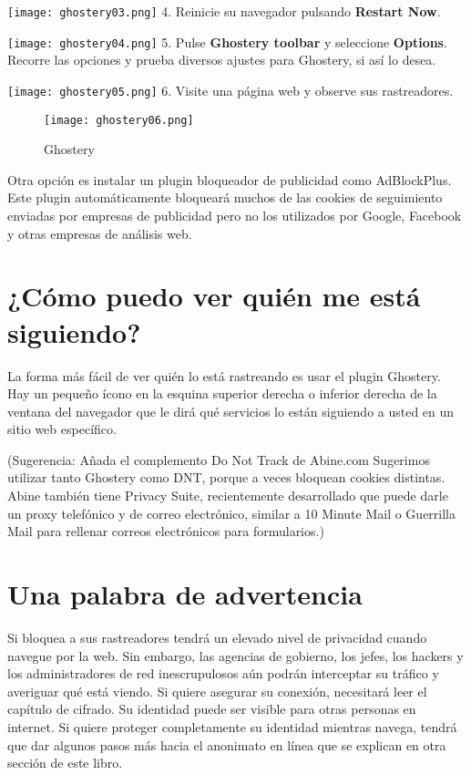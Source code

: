 \documentclass[10pt,a5paper,twoside,,]{book}
\begin{document}
\texttt{[image: ghostery03.png]} 4. Reinicie su navegador pulsando
\textbf{Restart Now}.

\texttt{[image: ghostery04.png]} 5. Pulse \textbf{Ghostery toolbar} y
seleccione \textbf{Options}. Recorre las opciones y prueba diversos
ajustes para Ghostery, si así lo desea.

\texttt{[image: ghostery05.png]} 6. Visite una página web y observe sus
rastreadores.

\begin{figure}[htbp]
\centering
\texttt{[image: ghostery06.png]}
\caption{Ghostery}
\end{figure}

Otra opción es instalar un plugin bloqueador de publicidad como
AdBlockPlus. Este plugin automáticamente bloqueará muchos de las cookies
de seguimiento enviadas por empresas de publicidad pero no los
utilizados por Google, Facebook y otras empresas de análisis web.

\section{¿Cómo puedo ver quién me está
siguiendo?}\label{cuxf3mo-puedo-ver-quiuxe9n-me-estuxe1-siguiendo}

La forma más fácil de ver quién lo está rastreando es usar el plugin
Ghostery. Hay un pequeño ícono en la esquina superior derecha o inferior
derecha de la ventana del navegador que le dirá qué servicios lo están
siguiendo a usted en un sitio web específico.

(Sugerencia: Añada el complemento Do Not Track de Abine.com Sugerimos
utilizar tanto Ghostery como DNT, porque a veces bloquean cookies
distintas. Abine también tiene Privacy Suite, recientemente desarrollado
que puede darle un proxy telefónico y de correo electrónico, similar a
10 Minute Mail o Guerrilla Mail para rellenar correos electrónicos para
formularios.)

\section{Una palabra de advertencia}\label{una-palabra-de-advertencia}

Si bloquea a sus rastreadores tendrá un elevado nivel de privacidad
cuando navegue por la web. Sin embargo, las agencias de gobierno, los
jefes, los hackers y los administradores de red inescrupulosos aún
podrán interceptar su tráfico y averiguar qué está viendo. Si quiere
asegurar su conexión, necesitará leer el capítulo de cifrado. Su
identidad puede ser visible para otras personas en internet. Si quiere
proteger completamente su identidad mientras navega, tendrá que dar
algunos pasos más hacia el anonimato en línea que se explican en otra
sección de este libro.
\end{document}
